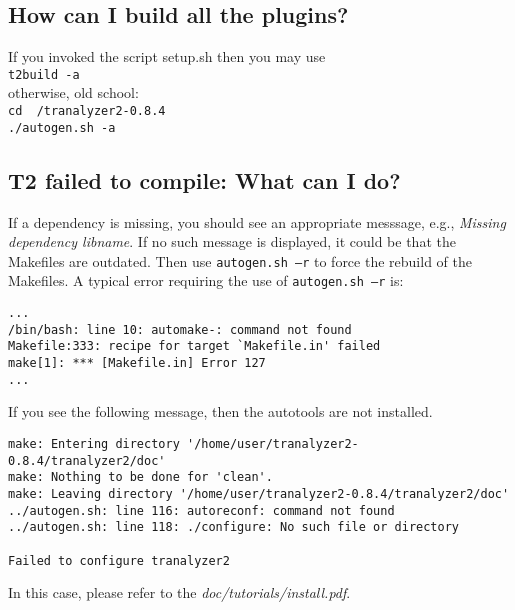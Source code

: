 \documentclass[documentation]{subfiles}
\begin{document}
\subsection{How can I build all the plugins?}
If you invoked the script setup.sh then you may use\\
{\tt t2build -a} \\
otherwise, old school:\\

{\tt cd ~/tranalyzer2-0.8.4\\
     ./autogen.sh -a}

\subsection{T2 failed to compile: What can I do?}
If a dependency is missing, you should see an appropriate messsage, e.g., {\em Missing dependency libname}.
If no such message is displayed, it could be that the Makefiles are outdated.
Then use {\tt autogen.sh --r} to force the rebuild of the Makefiles.
A typical error requiring the use of {\tt autogen.sh --r} is:
\begin{verbatim}
...
/bin/bash: line 10: automake-: command not found
Makefile:333: recipe for target `Makefile.in' failed
make[1]: *** [Makefile.in] Error 127
...
\end{verbatim}

If you see the following message, then the autotools are not installed.
\begin{verbatim}
make: Entering directory '/home/user/tranalyzer2-0.8.4/tranalyzer2/doc'
make: Nothing to be done for 'clean'.
make: Leaving directory '/home/user/tranalyzer2-0.8.4/tranalyzer2/doc'
../autogen.sh: line 116: autoreconf: command not found
../autogen.sh: line 118: ./configure: No such file or directory

Failed to configure tranalyzer2
\end{verbatim}
In this case, please refer to the {\em doc/tutorials/install.pdf}.
\end{document}
